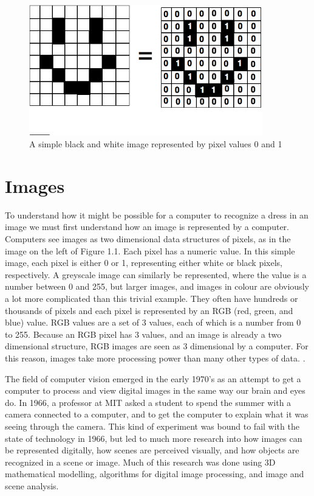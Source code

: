 \documentclass[12pt]{report} %
\begin{document}
\begin{figure}
\centering
\includegraphics[width=4in]{pixels} 
\caption{A simple black and white image represented by pixel values 0 and 1}
\label{Fig: SimpleBWPixels}
\end{figure}
	
\section{Images}
	To understand how it might be possible for a computer to recognize a dress in an image we must first understand how an image is represented by a computer. Computers see images as two dimensional data structures of pixels, as in the image on the left of Figure 1.1. Each pixel has a numeric value. In this simple image, each pixel is either 0 or 1, representing either white or black pixels, respectively. A greyscale image can similarly be represented, where the value is a number between 0 and 255, but larger images, and images in colour are obviously a lot more complicated than this trivial example. They often have hundreds or thousands of pixels and each pixel is represented by an RGB (red, green, and blue) value. RGB values are a set of 3 values, each of which is a number from 0 to 255. Because an RGB pixel has 3 values, and an image is already a two dimensional structure, RGB images are seen as 3 dimensional by a computer. For this reason, images take more processing power than many other types of data. \cite{szeliski2010computer}. 
	
	The field of computer vision emerged in the early 1970's as an attempt to get a computer to process and view digital images in the same way our brain and eyes do. In 1966, a professor at MIT asked a student to spend the summer with a camera connected to a computer, and to get the computer to explain what it was seeing through the camera. This kind of experiment was bound to fail with the state of technology in 1966, but led to much more research into how images can be represented digitally, how scenes are perceived visually, and how objects are recognized in a scene or image. Much of this research was done using 3D mathematical modelling, algorithms for digital image processing, and image and scene analysis. \cite{szeliski2010computer}
\end{document}
